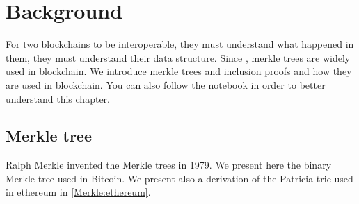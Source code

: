 \chapter{Background}
For two blockchains to be interoperable, they must understand what happened in them, they must understand their data structure.
Since \cite{Nakamoto..09}, merkle trees are widely used in blockchain. We introduce merkle trees and inclusion proofs and how they are used in blockchain. You can also follow the notebook \cite{inclusionproofsnotebook} in order to better understand this chapter.
\section{Merkle tree \cite{merkle1988digital}}
Ralph Merkle invented the Merkle trees in 1979. We present here the binary Merkle tree used in Bitcoin. We present also a derivation of the Patricia trie used in ethereum in \ref{Merkle:ethereum}.
